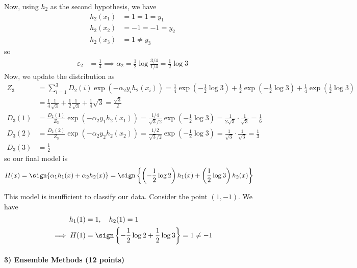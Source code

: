 \documentclass{article}
\begin{document}
\begin{soln}
	Now, using $h_2$ as the second hypothesis, we have
	\begin{align*}
		h_2(x_1) &= 1 = 1 = y_1 \\
		h_2(x_2) &= -1 =-1 = y_2 \\
		h_2(x_3) &= 1 \neq y_3
	\end{align*}
	so
	\begin{align*}
		\varepsilon_2 &= \frac{1}{4}  \implies \alpha_2 = \frac{1}{2} \log \frac{3/4}{1/4} = \frac{1}{2}\log 3
	\end{align*}
	Now, we update the distribution as
	\begin{align*}
		Z_3 &= \sum_{i=1}^{3} D_2(i)\exp\left( -\alpha_2 y_i h_2(x_i) \right) = \frac{1}{4}\exp\left( -\frac{1}{2}\log 3 \right) + \frac{1}{2}\exp\left( -\frac{1}{2}\log 3 \right) + \frac{1}{4}\exp\left( \frac{1}{2}\log 3 \right) \\
		&= \frac{1}{4} \frac{1}{\sqrt{3}} + \frac{1}{2}\frac{1}{\sqrt{3}} + \frac{1}{4}\sqrt{3}= \frac{\sqrt{3}}{2} \\
		D_3(1) &= \frac{D_2(1)}{Z_3}\exp\left( -\alpha_2 y_1 h_2(x_1) \right) = \frac{1/4}{\sqrt{3}/2}\exp\left(- \frac{1}{2}\log 3 \right) = \frac{1}{2\sqrt{3}}\cdot\frac{1}{\sqrt{3}} = \frac{1}{6} \\
		D_3(2) &= \frac{D_2(2)}{Z_3}\exp\left( -\alpha_2 y_2h_2(x_2) \right) = \frac{1/2}{\sqrt{3}/2}\exp\left( -\frac{1}{2}\log 3 \right) = \frac{1}{\sqrt{3}}\cdot \frac{1}{\sqrt{3}} = \frac{1}{3} \\
		D_3(3) &= \frac{1}{2}
	\end{align*}
	so our final model is
	\begin{align*}
		H(x) &= \sign\{\alpha_1h_1(x) + \alpha_2h_2(x)\} = \sign\left\{\left( -\frac{1}{2}\log 2 \right) h_1(x) + \left( \frac{1}{2}\log 3 \right) h_2(x) \right\}
	\end{align*}

	This model is insufficient to classify our data. Consider the point $(1, -1).$ We have
	\begin{align*}
		h_1(1) &= 1, \quad h_2(1) = 1 \\
		\implies H(1) &= \sign\left\{ -\frac{1}{2}\log 2 + \frac{1}{2}\log 3 \right\} = 1 \neq -1
	\end{align*}
\end{soln}

\paragraph{3) Ensemble Methods (12 points)}
\end{document}
